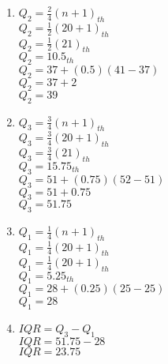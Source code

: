 \begin{enumerate}[label = \arabic*. ]
\item  \hspce $Q_2 = \displaystyle \frac{2}{4}(n+1)_{th} $  \redcheck \\ 
$Q_2 = \displaystyle \frac{1}{2}(20+1)_{th} $  \redcheck \\ 
$Q_2 = \displaystyle \frac{1}{2}(21)_{th} $  \redcheck \\ 
$Q_2=10.5_{th}$\redcheck \\ 
$Q_2=37+(0.5)(41-37)$\redcheck \\ 
$Q_2=37+2$\redcheck \\  
$Q_2=39$ \redcheck 

\item  \hspce $Q_3 = \displaystyle \frac{3}{4}(n+1)_{th} $ \redcheck \\
$Q_3 = \displaystyle \frac{3}{4}(20+1)_{th} $ \redcheck \\ 
$Q_3 = \displaystyle \frac{3}{4}(21)_{th} $ \redcheck \\ 
$Q_3=15.75_{th}$\redcheck \\ 
$Q_3=51+(0.75)(52-51)$\redcheck \\ 
$Q_3=51+0.75$\redcheck \\ 
$Q_3=51.75$ \redcheck 

\item  \hspce $Q_1 = \displaystyle \frac{1}{4}(n+1)_{th} $ \redcheck \\
$Q_1 = \displaystyle \frac{1}{4}(20+1)_{th} $ \redcheck \\
$Q_1 = \displaystyle \frac{1}{4}(20+1)_{th} $ \redcheck \\
$Q_1=5.25_{th}$\redcheck \\ 
$Q_1=28+(0.25)(25-25)$\redcheck \\ 
$Q_1=28$\redcheck 
\item \hspce  $IQR = Q_3 - Q_1$ \redcheck  \\
$IQR = 51.75 - 28$ \redcheck \\
$IQR = 23.75$ \redcheck

\end{enumerate}   